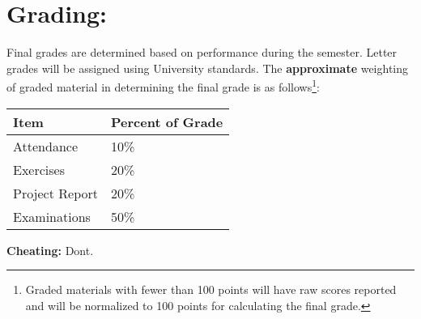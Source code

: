\documentclass[12pt]{article}
\begin{document}
\section*{Grading:} Final grades are determined based on performance during the semester.  Letter grades will be assigned using University standards.  The \textbf{approximate} weighting of graded material in determining the final grade is as follows\footnote{Graded materials with fewer than 100 points will have raw scores reported and will be normalized to 100 points for calculating the final grade.}:
\begin{table}[h!]
   \centering
   \begin{tabular}{l l}
Item & Percent of Grade \\
\hline
\hline
Attendance & 10\% \\
Exercises & 20\% \\
Project Report & 20\% \\
Examinations & 50\% \\
\hline
\end{tabular}
\end{table}

\textbf{Cheating:} Dont.

\clearpage
\end{document}

